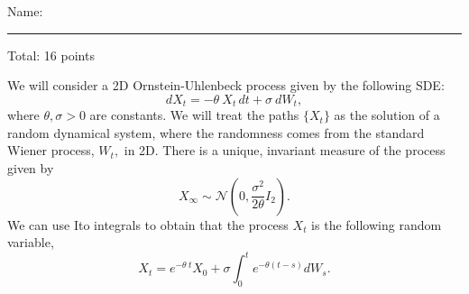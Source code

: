 \documentclass[12pt]{article}
\begin{document}
\begin{center}
Name: \rule{3in}{0.4pt} \hfill Total: 16 points
\end{center}
We will consider a 2D Ornstein-Uhlenbeck process given by the following SDE:
		\begin{equation}
			dX_t = -\theta\: X_t \, dt + \sigma\: dW_t,
		\end{equation}
		where $\theta, \sigma > 0$ are constants. We will treat the paths $\{X_t\}$ as the solution of a random dynamical system, where the randomness comes from the standard Wiener process, $W_t,$ in 2D. There is a unique, invariant measure of the process given by
		\begin{equation}
			X_\infty \sim \mathcal{N}\!\left(0, \frac{\sigma^2}{2\theta} I_2\right).
		\end{equation}
We can use Ito integrals to obtain that the process $X_t$ is the following random variable,
\begin{equation}
	X_t = e^{-\theta \: t} X_0 + \sigma \int_0^t e^{-\theta(t-s)} dW_s.
\end{equation}
\end{document}

